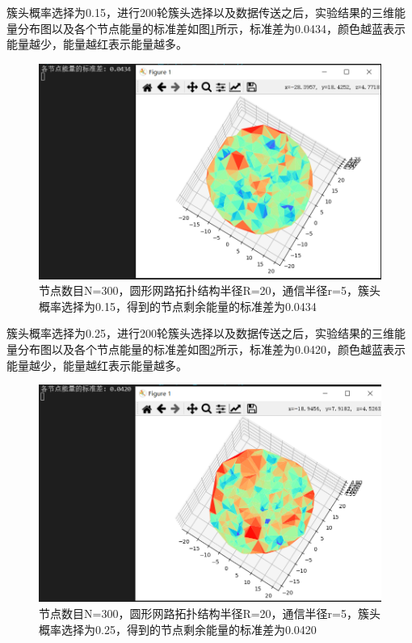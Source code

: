 \documentclass[UTF8]{article} %
\begin{document}
	簇头概率选择为0.15，进行200轮簇头选择以及数据传送之后，实验结果的三维能量分布图以及各个节点能量的标准差如图\ref{fig:screenshot007}所示，标准差为0.0434，颜色越蓝表示能量越少，能量越红表示能量越多。
	\begin{figure}[H]
		\centering
		\includegraphics[width=0.7\linewidth]{screenshot007}
		\caption{节点数目N=300，圆形网路拓扑结构半径R=20，通信半径r=5，簇头概率选择为0.15，得到的节点剩余能量的标准差为0.0434}
		\label{fig:screenshot007}
	\end{figure}
	
	簇头概率选择为0.25，进行200轮簇头选择以及数据传送之后，实验结果的三维能量分布图以及各个节点能量的标准差如图\ref{fig:screenshot008}所示，标准差为0.0420，颜色越蓝表示能量越少，能量越红表示能量越多。
	\begin{figure}[H]
		\centering
		\includegraphics[width=0.7\linewidth]{screenshot008}
		\caption{节点数目N=300，圆形网路拓扑结构半径R=20，通信半径r=5，簇头概率选择为0.25，得到的节点剩余能量的标准差为0.0420}
		\label{fig:screenshot008}
	\end{figure}
	
\end{document}
